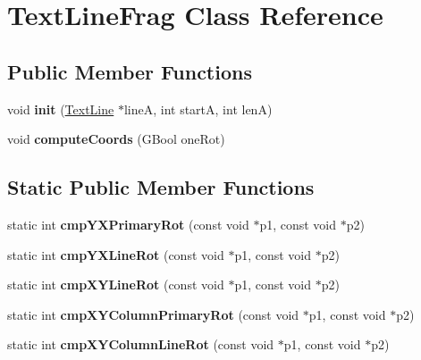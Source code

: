 \hypertarget{class_text_line_frag}{}\section{Text\+Line\+Frag Class Reference}
\label{class_text_line_frag}
\subsection*{Public Member Functions}
\begin{DoxyCompactItemize}
\item 
\mbox{\label{class_text_line_frag_ad6d15d2b765f564ab3fa61c938d15812}} 
void {\bfseries init} (\hyperlink{class_text_line}{Text\+Line} $\ast$lineA, int startA, int lenA)
\item 
\mbox{\label{class_text_line_frag_a6a323e73d6167e3364c991e43c522eb4}} 
void {\bfseries compute\+Coords} (G\+Bool one\+Rot)
\end{DoxyCompactItemize}
\subsection*{Static Public Member Functions}
\begin{DoxyCompactItemize}
\item 
\mbox{\label{class_text_line_frag_a509ad8296715d85f321d8847f420d78f}} 
static int {\bfseries cmp\+Y\+X\+Primary\+Rot} (const void $\ast$p1, const void $\ast$p2)
\item 
\mbox{\label{class_text_line_frag_a6151c46da190b3d59e4847e76cf7734b}} 
static int {\bfseries cmp\+Y\+X\+Line\+Rot} (const void $\ast$p1, const void $\ast$p2)
\item 
\mbox{\label{class_text_line_frag_a53bbe2c514fe2a58b7a21506ede488ee}} 
static int {\bfseries cmp\+X\+Y\+Line\+Rot} (const void $\ast$p1, const void $\ast$p2)
\item 
\mbox{\label{class_text_line_frag_a7d42e761b0b4bdaafc361bbd1accf96f}} 
static int {\bfseries cmp\+X\+Y\+Column\+Primary\+Rot} (const void $\ast$p1, const void $\ast$p2)
\item 
\mbox{\label{class_text_line_frag_ad8e4345647b7a5e6d4db55e2f770fc19}} 
static int {\bfseries cmp\+X\+Y\+Column\+Line\+Rot} (const void $\ast$p1, const void $\ast$p2)
\end{DoxyCompactItemize}
